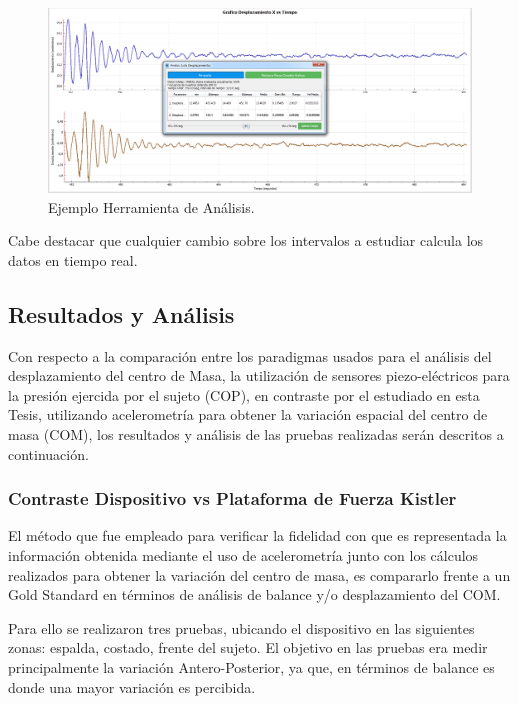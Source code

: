 \documentclass[12pt,a4paper]{article}
\begin{document}
\begin{figure}[H]
	\centering
	\includegraphics[scale=0.3]{images/graficosyreportes/analisisGraficos}
	\caption{Ejemplo Herramienta de Análisis.}
	\label{fig:analsisGraficos}
\end{figure}

Cabe destacar que cualquier cambio sobre los intervalos a estudiar calcula los datos en tiempo real.

\newpage
\subsection{Resultados y Análisis}
Con respecto a la comparación entre los paradigmas usados para el análisis del desplazamiento del centro de Masa, la utilización de sensores piezo-eléctricos para la presión ejercida por el sujeto (COP), en contraste por el estudiado en esta Tesis, utilizando acelerometría para obtener la variación espacial del centro de masa (COM), los resultados y análisis de las pruebas realizadas serán descritos a continuación.

\subsubsection{Contraste Dispositivo vs Plataforma de Fuerza Kistler}

El método que fue empleado para verificar la fidelidad con que es representada la información obtenida mediante el uso de acelerometría junto con los cálculos realizados para obtener la variación del centro de masa, es compararlo frente a un Gold Standard en términos de análisis de balance y/o desplazamiento del COM.

Para ello se realizaron tres pruebas, ubicando el dispositivo en las siguientes zonas: espalda, costado, frente del sujeto.
El objetivo en las pruebas era medir principalmente la variación Antero-Posterior, ya que, en términos de balance es donde una mayor variación es percibida.
\end{document}
